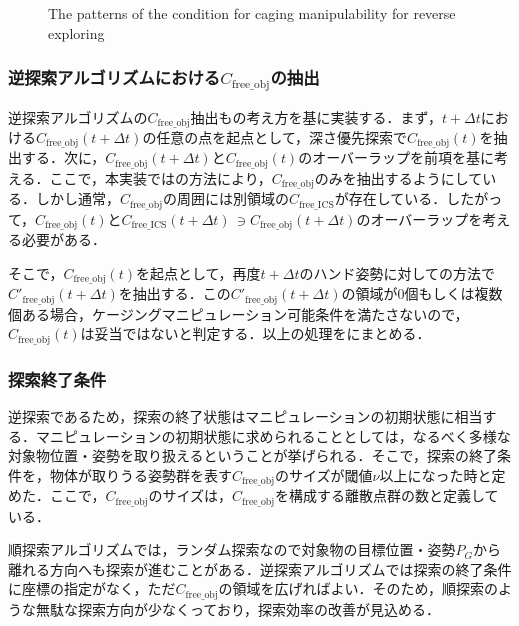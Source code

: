 \documentclass[a4paper,twoside,12pt,papersize, dvipdfmx]{iirthesis}
\begin{document}
{\begin{figure}[b]
\begin{minipage}{0.33\hsize}
\subcaption{}\label{fig::planner::cm3}
\end{minipage}
\caption{The patterns of the condition for caging manipulability for reverse exploring}
\label{fig::planner::cm}
\end{figure}

\subsubsection{逆探索アルゴリズムにおける$C_{\mathrm{free\_obj}}$の抽出}
逆探索アルゴリズムの$C_{\mathrm{free\_obj}}$抽出もの考え方を基に実装する．まず，$t+\Delta t$における$C_{\mathrm{free\_obj}}(t+\Delta t)$の任意の点を起点として，深さ優先探索で$C_{\mathrm{free\_obj}}(t)$を抽出する．次に，$C_{\mathrm{free\_obj}}(t+\Delta t)$と$C_{\mathrm{free\_obj}}(t)$のオーバーラップを前項を基に考える．ここで，本実装ではの方法により，$C_{\mathrm{free\_obj}}$のみを抽出するようにしている．しかし通常，$C_{\mathrm{free\_obj}}$の周囲には別領域の$C_{\mathrm{free\_ICS}}$が存在している．したがって，$C_{\mathrm{free\_obj}}(t)$と$C_{\mathrm{free\_ICS}}(t+\Delta t)\, \ni C_{\mathrm{free\_obj}}(t+\Delta t)$のオーバーラップを考える必要がある．\par
そこで，$C_{\mathrm{free\_obj}}(t)$を起点として，再度$t+\Delta t$のハンド姿勢に対しての方法で$C'_{\mathrm{free\_obj}}(t+\Delta t)$を抽出する．この$C'_{\mathrm{free\_obj}}(t+\Delta t)$の領域が0個もしくは複数個ある場合，ケージングマニピュレーション可能条件を満たさないので，$C_{\mathrm{free\_obj}}(t)$は妥当ではないと判定する．以上の処理をにまとめる．

\subsubsection{探索終了条件}
逆探索であるため，探索の終了状態はマニピュレーションの初期状態に相当する．マニピュレーションの初期状態に求められることとしては，なるべく多様な対象物位置・姿勢を取り扱えるということが挙げられる．そこで，探索の終了条件を，物体が取りうる姿勢群を表す$C_{\mathrm{free\_obj}}$のサイズが閾値$\nu$以上になった時と定めた．ここで，$C_{\mathrm{free\_obj}}$のサイズは，$C_{\mathrm{free\_obj}}$を構成する離散点群の数と定義している．\par
順探索アルゴリズムでは，ランダム探索なので対象物の目標位置・姿勢$P_G$から離れる方向へも探索が進むことがある．逆探索アルゴリズムでは探索の終了条件に座標の指定がなく，ただ$C_{\mathrm{free\_obj}}$の領域を広げればよい．そのため，順探索のような無駄な探索方向が少なくっており，探索効率の改善が見込める．


}
\end{document}
